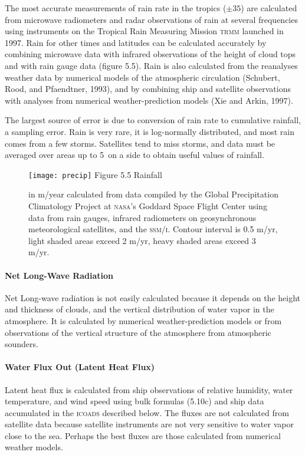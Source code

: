 The most accurate measurements of rain rate in the tropics ($\pm 35$\degrees) are
calculated from microwave radiometers and radar observations of rain at several
frequencies using instruments on the Tropical Rain Measuring Mission
\textsc{trmm} launched in 1997. Rain for other times and latitudes can be
calculated accurately by combining microwave data with infrared observations of
the height of cloud tops and with rain gauge data (figure 5.5). Rain is also
calculated from the reanalyses weather data by numerical models of the atmospheric circulation (Schubert,
Rood, and Pfaendtner, 1993), and by combining ship and satellite observations with analyses from
numerical weather-prediction models (Xie and Arkin, 1997).

The largest source of error is due to conversion of rain rate to cumulative
rainfall, a sampling error. Rain is very rare, it is log-normally
distributed, and most rain comes from a few storms. Satellites tend to miss storms, and data
must be averaged over areas up to 5\degrees\ on a side to obtain useful
values of rainfall.

\begin{figure}[t!]
\texttt{[image: precip]} 
\footnotesize Figure 5.5 Rainfall
\rule{0pt}{3ex}in m/year calculated from data compiled by the Global
Precipitation Climatology Project at \textsc{nasa}'s Goddard Space
Flight Center using data from rain gauges, infrared radiometers on
geosynchronous meteorological satellites, and the \textsc{ssm/i}.
Contour interval is 0.5 m/yr, light shaded areas exceed 2 m/yr,
heavy shaded areas exceed 3 m/yr. \label{fig:precip}
\vspace{-4ex}
\end{figure}

\paragraph{Net Long-Wave Radiation}
Net Long-wave
radiation is not easily calculated because it depends on the height and thickness
of clouds, and the vertical distribution of water vapor in the atmosphere. It is
calculated by numerical weather-prediction models or from observations of the
vertical structure of the atmosphere from atmospheric sounders.

\paragraph{Water Flux Out (Latent Heat Flux)}
Latent heat flux is calculated from ship observations of relative humidity, water
temperature, and wind speed using bulk formulas (5.10c) and ship data accumulated
in the \textsc{icoads} described below. The fluxes are not calculated from satellite data because satellite instruments are not very sensitive to water vapor close to the sea. Perhaps the best fluxes are those calculated from
numerical weather models.

